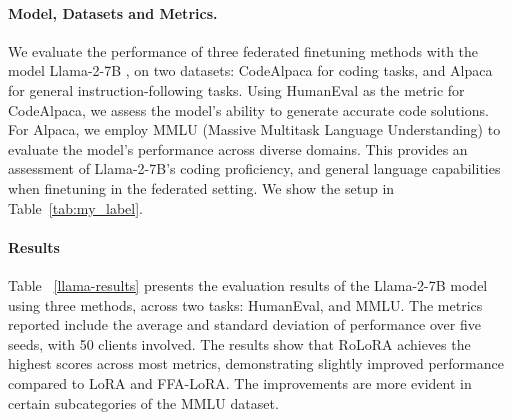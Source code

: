 \documentclass{article}
\theoremstyle{plain}
\theoremstyle{definition}
\theoremstyle{remark}
\begin{document}
\paragraph{Model, Datasets and Metrics.}
We evaluate the performance of three federated finetuning methods with the model Llama-2-7B \cite{touvron2023llama2openfoundation}, on two datasets: CodeAlpaca \cite{codealpaca} for coding tasks, and Alpaca \cite{alpaca} for general instruction-following tasks. Using HumanEval \cite{chen2021codex} as the metric for CodeAlpaca, we assess the model’s ability to generate accurate code solutions. For Alpaca, we employ MMLU (Massive Multitask Language Understanding) \cite{hendrycks2021measuringmassivemultitasklanguage} to evaluate the model's performance across diverse domains. This provides an assessment of Llama-2-7B's coding proficiency, and general language capabilities when finetuning in the federated setting. We show the setup in Table~\ref{tab:my_label}.
\paragraph{Results}
Table ~\ref{llama-results} presents the evaluation results of the Llama-2-7B model using three methods, across two tasks: HumanEval, and MMLU. The metrics reported include the average and standard deviation of performance over five seeds, with 50 clients involved. The results show that RoLoRA achieves the highest scores across most metrics, demonstrating slightly improved performance compared to LoRA and FFA-LoRA. The improvements are more evident in certain subcategories of the MMLU dataset. 
\end{document}
